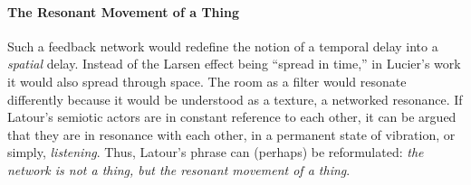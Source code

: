 \paragraph{The Resonant Movement of a Thing}
Such a feedback network would redefine the notion of a temporal delay into a \textit{spatial} delay. Instead of the Larsen effect being ``spread in time,'' in Lucier's work it would also spread through space. The room as a filter would resonate differently because it would be understood as a texture, a networked resonance. If Latour's semiotic actors are in constant reference to each other, it can be argued that they are in resonance with each other, in a permanent state of vibration, or simply, \textit{listening}. Thus, Latour's phrase can (perhaps) be reformulated: \textit{the network is not a thing, but the resonant movement of a thing}. 

